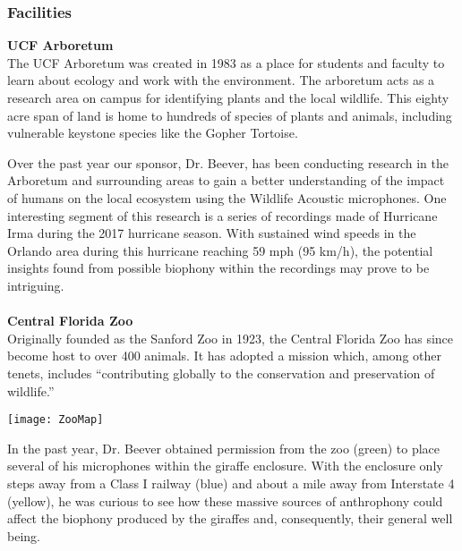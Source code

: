 \subsubsection{Facilities}
\textbf{UCF Arboretum}\\
The UCF Arboretum was created in 1983 as a place for students and faculty to learn about ecology and work with the environment. The arboretum acts as a research area on campus for identifying plants and the local wildlife\cite{ucfarboretum}. This eighty acre span of land is home to hundreds of species of plants and animals, including vulnerable keystone species like the Gopher Tortoise.\cite{pegasus}\par
Over the past year our sponsor, Dr. Beever, has been conducting research in the Arboretum and surrounding areas to gain a better understanding of the impact of humans on the local ecosystem using the Wildlife Acoustic microphones. One interesting segment of this research is a series of recordings made of Hurricane Irma during the 2017 hurricane season. With sustained wind speeds in the Orlando area during this hurricane reaching 59 mph (95 km/h),\cite{irmaspeed} the potential insights found from possible biophony within the recordings may prove to be intriguing.\\\\
\textbf{Central Florida Zoo}\\
Originally founded as the Sanford Zoo in 1923, the Central Florida Zoo has since become host to over 400 animals. It has adopted a mission which, among other tenets, includes ``contributing globally to the conservation and preservation of wildlife.''\cite{aboutzoo}\par
\begin{center}
	\texttt{[image: ZooMap]}
\end{center}
In the past year, Dr. Beever obtained permission from the zoo (green) to place several of his microphones within the giraffe enclosure. With the enclosure only steps away from a Class I railway (blue) and about a mile away from Interstate 4 (yellow), he was curious to see how these massive sources of anthrophony could affect the biophony produced by the giraffes and, consequently, their general well being.
